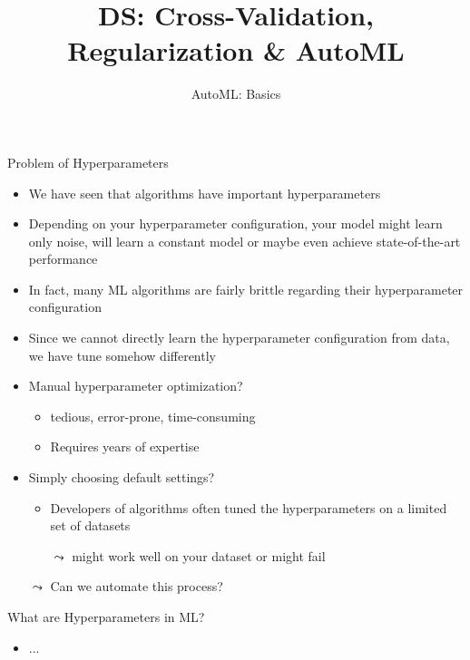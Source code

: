 \documentclass[aspectratio=169]{../latex_main/tntbeamer}  %
\title[CV, Reg \& AutoML]{DS: Cross-Validation, Regularization \& AutoML}
\subtitle{AutoML: Basics}
\begin{document}
\maketitle

\begin{frame}[c]{Problem of Hyperparameters}
	
	\begin{itemize}
	    \item We have seen that algorithms have important hyperparameters
	    \item Depending on your hyperparameter configuration, your model might learn only noise, will learn a constant model or maybe even achieve state-of-the-art performance 
	    \item In fact, many ML algorithms are fairly brittle regarding their hyperparameter configuration
	    \medskip
	    \item Since we cannot directly learn the hyperparameter configuration from data, we have tune somehow differently
	    \item Manual hyperparameter optimization?
	    \begin{itemize}
	        \item tedious, error-prone, time-consuming
	        \item Requires years of expertise
	    \end{itemize}
	    \smallskip
	    \item Simply choosing default settings?
	    \begin{itemize}
	        \item Developers of algorithms often tuned the hyperparameters on a limited set of datasets
	        \item[$\leadsto$] might work well on your dataset or might fail
	    \end{itemize}
	    \item[$\leadsto$] Can we automate this process?
	\end{itemize}
	
\end{frame}
\begin{frame}[c]{What are Hyperparameters in ML?}
	
	\begin{itemize}
	    \item ...
	\end{itemize}
	
\end{frame}
\end{document}
